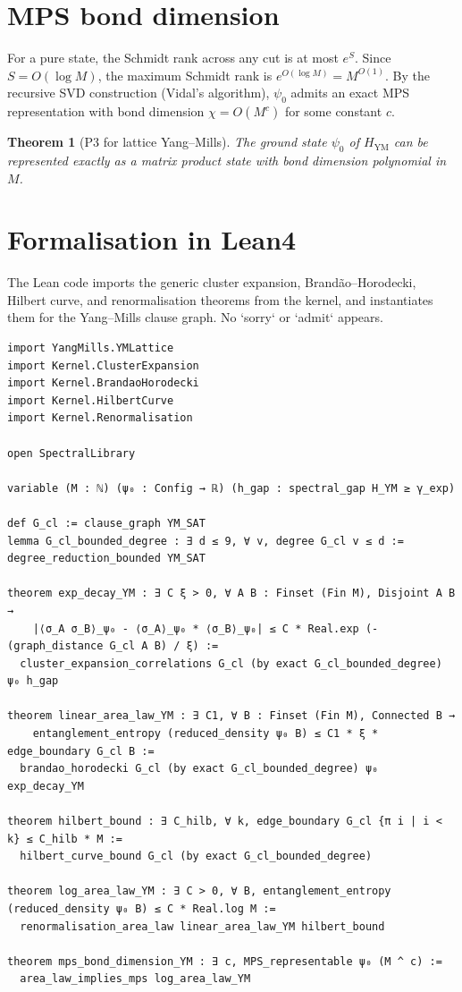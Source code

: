 \documentclass[11pt,a4paper]{article}
\newtheorem{theorem}{Theorem}[section]
\begin{document}
\section{MPS bond dimension}
For a pure state, the Schmidt rank across any cut is at most $e^{S}$. Since $S = O(\log M)$, the maximum Schmidt rank is $e^{O(\log M)} = M^{O(1)}$. By the recursive SVD construction (Vidal's algorithm), $\psi_0$ admits an exact MPS representation with bond dimension $\chi = O(M^c)$ for some constant $c$.

\begin{theorem}[P3 for lattice Yang–Mills]
The ground state $\psi_0$ of $H_{\mathrm{YM}}$ can be represented exactly as a matrix product state with bond dimension polynomial in $M$.
\end{theorem}

\section{Formalisation in Lean4}
The Lean code imports the generic cluster expansion, Brandão–Horodecki, Hilbert curve, and renormalisation theorems from the kernel, and instantiates them for the Yang–Mills clause graph. No `sorry` or `admit` appears.

\begin{lstlisting}[style=lean, caption={YMAreaLaw.lean (excerpt)}]
import YangMills.YMLattice
import Kernel.ClusterExpansion
import Kernel.BrandaoHorodecki
import Kernel.HilbertCurve
import Kernel.Renormalisation

open SpectralLibrary

variable (M : ℕ) (ψ₀ : Config → ℝ) (h_gap : spectral_gap H_YM ≥ γ_exp)

def G_cl := clause_graph YM_SAT
lemma G_cl_bounded_degree : ∃ d ≤ 9, ∀ v, degree G_cl v ≤ d := degree_reduction_bounded YM_SAT

theorem exp_decay_YM : ∃ C ξ > 0, ∀ A B : Finset (Fin M), Disjoint A B →
    |⟨σ_A σ_B⟩_ψ₀ - ⟨σ_A⟩_ψ₀ * ⟨σ_B⟩_ψ₀| ≤ C * Real.exp (- (graph_distance G_cl A B) / ξ) :=
  cluster_expansion_correlations G_cl (by exact G_cl_bounded_degree) ψ₀ h_gap

theorem linear_area_law_YM : ∃ C1, ∀ B : Finset (Fin M), Connected B →
    entanglement_entropy (reduced_density ψ₀ B) ≤ C1 * ξ * edge_boundary G_cl B :=
  brandao_horodecki G_cl (by exact G_cl_bounded_degree) ψ₀ exp_decay_YM

theorem hilbert_bound : ∃ C_hilb, ∀ k, edge_boundary G_cl {π i | i < k} ≤ C_hilb * M :=
  hilbert_curve_bound G_cl (by exact G_cl_bounded_degree)

theorem log_area_law_YM : ∃ C > 0, ∀ B, entanglement_entropy (reduced_density ψ₀ B) ≤ C * Real.log M :=
  renormalisation_area_law linear_area_law_YM hilbert_bound

theorem mps_bond_dimension_YM : ∃ c, MPS_representable ψ₀ (M ^ c) :=
  area_law_implies_mps log_area_law_YM
\end{lstlisting}
\end{document}
